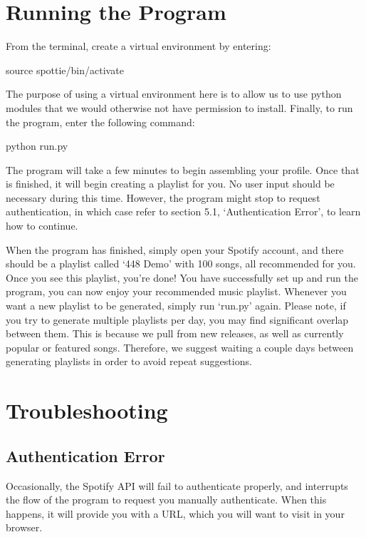 \documentclass{roffin}
\begin{document}
\section{Running the Program} 
From the terminal, create a virtual environment by entering:
\newline

\hspace{1cm} source spottie/bin/activate

\hfill
\newline
The purpose of using a virtual environment here is to allow us to use python modules that we would otherwise not have permission to install. Finally, to run the program, enter the following command:
\newline

\hspace{1cm} python run.py

\hfill
\newline
The program will take a few minutes to begin assembling your profile. Once that is finished, it will begin creating a playlist for you. No user input should be necessary during this time. However, the program might stop to request authentication, in which case refer to section 5.1, `Authentication Error', to learn how to continue.

When the program has finished, simply open your Spotify account, and there should be a playlist called `448 Demo' with 100 songs, all recommended for you. Once you see this playlist, you're done! You have successfully set up and run the program, you can now enjoy your recommended music playlist. Whenever you want a new playlist to be generated, simply run `run.py' again. Please note, if you try to generate multiple playlists per day, you may find significant overlap between them. This is because we pull from new releases, as well as currently popular or featured songs. Therefore, we suggest waiting a couple days between generating playlists in order to avoid repeat suggestions.

\section{Troubleshooting} 

\subsection{Authentication Error}
Occasionally, the Spotify API will fail to authenticate properly, and interrupts the flow of the program to request you manually authenticate. When this happens, it will provide you with a URL, which you will want to visit in your browser.
\end{document}
